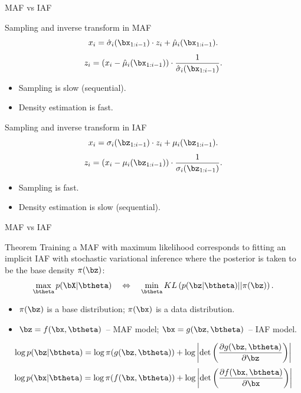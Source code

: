 \begin{frame}{MAF vs IAF}
	\begin{block}{Sampling and inverse transform in MAF}
		\vspace{-0.2cm}
		\[
		x_i = \hat{\sigma}_i (\bx_{1:i-1}) \cdot z_i + \hat{\mu}_i(\bx_{1:i-1}).
		\]
		\[
		z_i = \left(x_i - \hat{\mu}_i(\bx_{1:i-1}) \right) \cdot \frac{1}{\hat{\sigma}_i (\bx_{1:i-1}) }.
		\]
		\vspace{-0.5cm}
		\begin{itemize}
			\item Sampling is slow (sequential).
			\item Density estimation is fast.
		\end{itemize}
	\end{block}
	\begin{block}{Sampling and inverse transform in IAF}
		\vspace{-0.2cm}
		\[
		x_i = \sigma_i (\bz_{1:i-1}) \cdot z_i + \mu_i(\bz_{1:i-1}).
		\]
		\[
		z_i = \left(x_i - \mu_i(\bz_{1:i-1}) \right) \cdot \frac{1}{\sigma_i (\bz_{1:i-1})}.
		\]
		\vspace{-0.3cm}
		\begin{itemize}
			\item Sampling is fast.
			\item Density estimation is slow (sequential).
		\end{itemize}
	\end{block}
\end{frame}
\begin{frame}{MAF vs IAF}
	\begin{block}{Theorem}
		Training a MAF with maximum likelihood corresponds to fitting an implicit IAF  with stochastic variational inference where the posterior is taken to be the base density $\pi(\bz)$:
		\[  
		\max_{\btheta} p(\bX | \btheta) \quad \Leftrightarrow \quad \min_{\btheta} KL\left(p(\bz | \btheta) || \pi(\bz)\right).
		\]
		\vspace{-0.5cm}
		\begin{itemize}
			\item $\pi(\bz)$ is a base distribution; $\pi(\bx)$ is a data distribution.
			\item $\bz = f(\bx, \btheta)$~-- MAF model; $\bx = g(\bz, \btheta)$~-- IAF model.
		\end{itemize}
	\end{block}
	\vspace{-0.3cm}
	\[
	\log p(\bz | \btheta) = \log \pi(g(\bz, \btheta)) + \log \left| \det \left( \frac{\partial g(\bz, \btheta)}{\partial \bz}\right) \right|
	\]
	\[
	\log p(\bx | \btheta) = \log \pi(f(\bx, \btheta)) + \log \left| \det \left( \frac{\partial f(\bx, \btheta)}{\partial \bx}\right) \right|
	\]
\end{frame}
